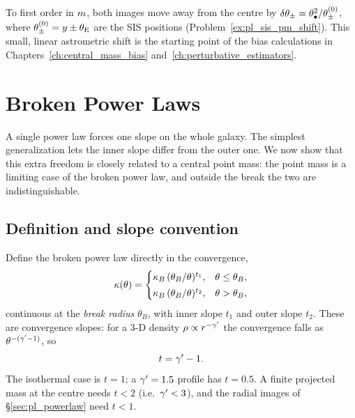 To first order in $m$, both images move away from the centre
by $\delta\theta_\pm=\theta_{\bullet}^2/\theta_\pm^{(0)}$, where
$\theta_\pm^{(0)}=y\pm\theta_{\mathrm{E}}$ are the SIS positions
(Problem~\ref{ex:pl_sis_pm_shift}).  This small, linear astrometric
shift is the starting point of the bias calculations in
Chapters~\ref{ch:central_mass_bias} and~\ref{ch:perturbative_estimators}.


\section{Broken Power Laws}
\label{sec:bpl_broken}

A single power law forces one slope on the whole galaxy.  The simplest
generalization lets the inner slope differ from the outer one.  We now
show that this extra freedom is closely related to a central point
mass: the point mass is a limiting case of the broken power law, and
outside the break the two are indistinguishable.

\subsection{Definition and slope convention}
\label{sec:bpl_convention}

Define the broken power law directly in the convergence,
\begin{equation}
    \kappa(\theta)=
    \begin{cases}
      \kappa_B\,(\theta_B/\theta)^{t_1}, & \theta\le\theta_B ,\\[2pt]
      \kappa_B\,(\theta_B/\theta)^{t_2}, & \theta>\theta_B ,
    \end{cases}
    \label{eq:bpl_kappa}
\end{equation}
continuous at the \emph{break radius} $\theta_B$, with inner slope
$t_1$ and outer slope $t_2$.  These are convergence slopes: for
a 3-D density $\rho\propto r^{-\gamma'}$ the convergence falls as
$\theta^{-(\gamma'-1)}$, so
\begin{equation}
    t=\gamma'-1 .
    \label{eq:bpl_slope_convention}
\end{equation}
The isothermal case is $t=1$; a $\gamma'=1.5$ profile has $t=0.5$.  A
finite projected mass at the centre needs $t<2$ (i.e.\ $\gamma'<3$), and
the radial images of \S\ref{sec:pl_powerlaw} need $t<1$.

